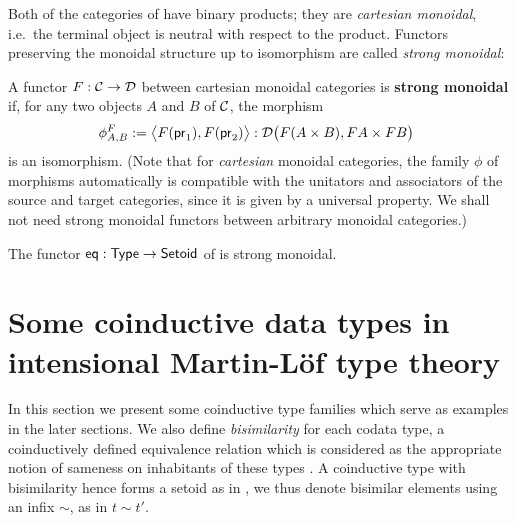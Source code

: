 \documentclass{amsart}
\newcommand{\fat}[1]{\textbf{#1}}
\begin{document}
Both of the categories of  have binary products; they are \emph{cartesian monoidal}, i.e.\ the terminal 
object is neutral with respect to the product. Functors preserving the monoidal structure up to isomorphism
are called \emph{strong monoidal}:

\begin{definition}\label{def:monoidal_functor}
 A functor $F:{\mathcal{C}}\to\mathcal{D}$ between cartesian monoidal categories is \fat{strong monoidal} if, for any two objects $A$ and $B$ of ${\mathcal{C}}$,
  the morphism
 \[ \phi^F_{A,B} := \bigl\langle F(\mathsf{pr}_1), F(\mathsf{pr}_2) \bigr\rangle : \mathcal{D}\bigl(F(A\times B), FA\times FB\bigr)\enspace  \] 
 is an isomorphism.
 (Note that for \emph{cartesian} monoidal categories, the family $\phi$ of morphisms automatically 
  is compatible with the unitators and associators of the source and target categories, 
  since it is given by a universal property. 
  We shall not need strong monoidal functors between arbitrary monoidal categories.)
\end{definition}

\begin{example}
  The functor $\mathsf{eq}: \mathsf{Type} \to \mathsf{Setoid}$ of  is strong monoidal.
\end{example}


\section{Some coinductive data types in intensional Martin-L\"of type theory}\label{sec:tri}

In this section we present some coinductive type families which serve as examples in the later sections.
We also define \emph{bisimilarity} for each codata type, a coinductively defined equivalence relation which is considered 
as the appropriate notion of sameness on inhabitants of these types \parencite{DBLP:conf/types/Coquand93, DBLP:journals/corr/abs-cs-0603119}.
A coinductive type with bisimilarity hence forms a setoid as in , 
we thus denote bisimilar elements using an infix $\sim$, as in $t \sim t'$. 
\end{document}
